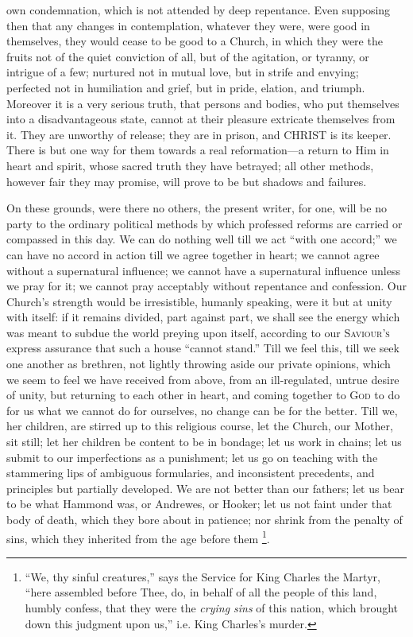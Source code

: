 own condemnation, which is not attended by deep repentance. Even
supposing then that any changes in contemplation, whatever they were,
were good in themselves, they would cease to be good to a Church, in
which they were the fruits not of the quiet conviction of all, but of
the agitation, or tyranny, or intrigue of a few; nurtured not in
mutual love, but in strife and envying; perfected not in humiliation
and grief, but in pride, elation, and triumph. Moreover it is a very
serious truth, that persons and bodies, who put themselves into a
disadvantageous state, cannot at their pleasure extricate themselves
from it. They are unworthy of release; they are in prison, and CHRIST
is its keeper. There is but one way for them towards a real
reformation—a return to Him in heart and spirit, whose sacred truth
they have betrayed; all other methods, however fair they may promise,
will prove to be but shadows and failures.

On these grounds, were there no others, the present writer, for
one, will be no party to the ordinary political methods by which
professed reforms are carried or compassed in this day. We can do
nothing well till we act ``with one accord;'' we can have no
accord in action till we agree together in heart; we cannot
agree without a supernatural influence; we cannot have a supernatural
influence unless we pray for it; we cannot pray acceptably without
repentance and confession. Our Church's strength would be
irresistible, humanly speaking, were it but at unity with itself: if
it remains divided, part against part, we shall see the energy which
was meant to subdue the world preying upon itself, according to our S\textsc{aviour's}
express assurance that such a house ``cannot stand.'' Till we
feel this, till we seek one another as brethren, not lightly throwing
aside our private opinions, which we seem to feel we have received
from above, from an ill-regulated, untrue desire of unity, but
returning to each other in heart, and coming together to G\textsc{od}
to do for us what we cannot do for ourselves, no change can be for the
better. Till we, her children, are stirred up to this religious
course, let the Church, our Mother, sit still; let her children be
content to be in bondage; let us work in chains; let us submit to our
imperfections as a punishment; let us go on teaching with the
stammering lips of ambiguous formularies, and inconsistent precedents,
and principles but partially developed. We are not better than our
fathers; let us bear to be what Hammond was, or Andrewes, or Hooker;
let us not faint under that body of death, which they bore about in
patience; nor shrink from the penalty of sins, which they inherited
from the age before them \footnote{``We, thy sinful creatures,'' says
the Service for King Charles the Martyr, ``here assembled before
Thee, do, in behalf of all the people of this land, humbly confess,
that they were the \emph{crying sins} of this nation, which brought down this
judgment upon us,'' i.e. King Charles's murder.}.

